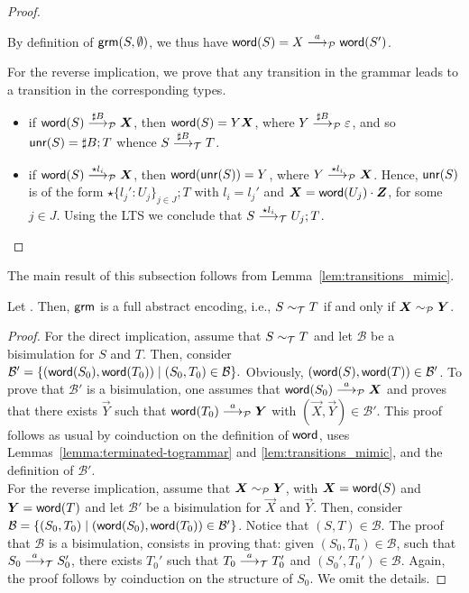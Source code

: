 \begin{proof}
\begin{itemize}
		By definition of $\grm(S,\emptyset)$, we thus have
		$\word(S) = X \LTSderivesP \word(S')$. \smallskip
	\end{itemize}
	For the reverse implication, we prove that any transition in the
	grammar leads to a transition in the corresponding types.
	\begin{itemize}
		\item if $\word(S)\LTSderivesP[\sharp B] \vec X$, then
		$\word(S) = Y \vec X$, where $Y\LTSderivesP[\sharp B] \varepsilon$,
		and so $\Unravel(S) = \sharp B; T$ whence $S\LTSderives[\sharp B] T$.
		\item if $\word(S) \LTSderivesP[\star l_i] \vec X $, then
		$\word(\Unravel(S)) = Y $, where $Y\LTSderivesP[\star l_i] \vec X$.
		Hence, $\Unravel (S)$ is of the form $\star\{l_j' :U_j\}_{j\in J};T$ with $l_i = l_j'$ and
		$\vec X = \word(U_j) \cdot \vec Z$, for some $j\in J$. Using 
		the LTS we conclude that 
		$S \LTSderives[\star l_i] U_j ; T$.
	\end{itemize}
\end{proof}

The main result of this subsection follows from
Lemma~\ref{lem:transitions_mimic}.

\begin{theorem}
  \label{thm:equiv_coincide}
  Let \grmcontext. Then, $\grm$ is a full abstract encoding, i.e.,
  $S \TypeEquiv T$ if and only if $\vec X \ProdEquiv \vec Y$.
\end{theorem}

\begin{proof}
For the direct implication, assume that $S \TypeEquiv T$ and let
$\mathcal{B}$ be a bisimulation for $S$ and $T$. Then, consider 
$ \mathcal{B}' = 
\{(\word (S_0), \word(T_0))\mid (S_0,T_0)\in \mathcal{B} \}. $
Obviously, $(\word(S), \word(T))\in \mathcal{B}'$. To prove that
$\mathcal{B}'$ is a bisimulation, one assumes that 
$\word (S_0)\LTSderivesP \vec X $ and proves that there exists
$\vec Y$ such that $\word (T_0)\LTSderivesP \vec Y $
with $(\vec X, \vec Y)\in \mathcal{B}'$. This proof follows 
as usual by coinduction on the definition of $\word$, uses 
Lemmas~\ref{lemma:terminated-togrammar}
and \ref{lem:transitions_mimic},
and the definition of $\mathcal{B}'$. \smallskip\\
For the reverse implication, assume that 
$\vec X \ProdEquiv \vec Y$, with $\vec X = \word (S)$ and
$\vec Y = \word(T)$ and let $\mathcal{B}'$ be a bisimulation
for $\vec X$ and $\vec Y$. Then, consider
$\mathcal{B} = \{(S_0, T_0)\mid (\word(S_0),\word(T_0))\in \mathcal{B}'\}$.
Notice that $(S,T)\in \mathcal{B}$.
The proof that $\mathcal{B}$ is a bisimulation, consists in proving that:
given $(S_0, T_0)\in \mathcal{B}$, such that $S_0\LTSderives S_0'$,
there exists $T_0'$ such that $T_0\LTSderives T_0'$
and $(S_0',T_0')\in \mathcal{B}$. Again, the proof
follows by coinduction on the structure of $S_0$. 
We omit the details. 
\end{proof}

